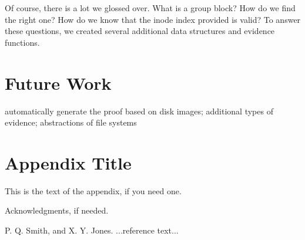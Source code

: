 \documentclass[nocopyrightspace]{sigplanconf}
\begin{document}
Of course, there is a lot we glossed over. What is a group block? How do we
find the right one? How do we know that the inode index provided is valid? To
answer these questions, we created several additional data structures and
evidence functions.

\section{Future Work}

automatically generate the proof based on disk images; additional types of
evidence; abstractions of file systems


\appendix
\section{Appendix Title}

This is the text of the appendix, if you need one.

\acks

Acknowledgments, if needed.





\begin{thebibliography}{}
\softraggedright

P. Q. Smith, and X. Y. Jones. ...reference text...

\end{thebibliography}
\end{document}
